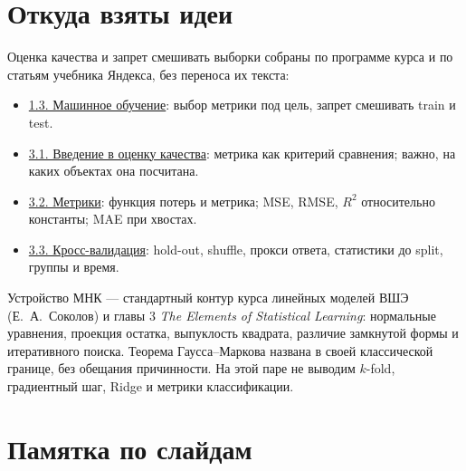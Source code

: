 \documentclass[11pt,a4paper]{article}
\begin{document}
\section{Откуда взяты идеи}

Оценка качества и запрет смешивать выборки собраны по программе курса и по статьям учебника Яндекса, без переноса их текста:

\begin{itemize}
\item \href{https://contest.yandex.ru/tracks/ml/introduction/machine-learning}{1.3. Машинное обучение}: выбор метрики под цель, запрет смешивать train и test.
\item \href{https://contest.yandex.ru/tracks/ml/model-evaluation/introduction}{3.1. Введение в оценку качества}: метрика как критерий сравнения; важно, на каких объектах она посчитана.
\item \href{https://contest.yandex.ru/tracks/ml/model-evaluation/classification-and-regression-metrics}{3.2. Метрики}: функция потерь и метрика; MSE, RMSE, \(R^{2}\) относительно константы; MAE при хвостах.
\item \href{https://contest.yandex.ru/tracks/ml/model-evaluation/cross-validation}{3.3. Кросс-валидация}: hold-out, shuffle, прокси ответа, статистики до split, группы и время.
\end{itemize}

Устройство МНК --- стандартный контур курса линейных моделей ВШЭ (Е.~А.~Соколов) и главы 3 \emph{The Elements of Statistical Learning}: нормальные уравнения, проекция остатка, выпуклость квадрата, различие замкнутой формы и итеративного поиска. Теорема Гаусса--Маркова названа в своей классической границе, без обещания причинности. На этой паре не выводим \(k\)-fold, градиентный шаг, Ridge и метрики классификации.

\section{Памятка по слайдам}
\end{document}

